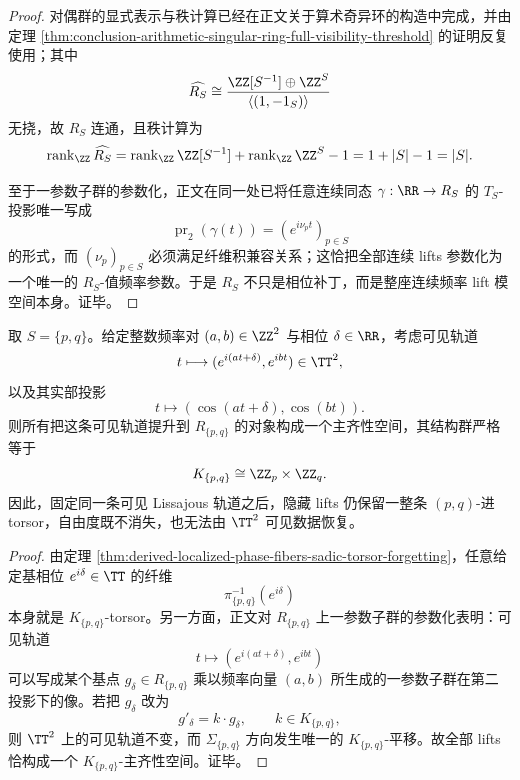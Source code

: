 \begin{proof}
对偶群的显式表示与秩计算已经在正文关于算术奇异环的构造中完成，并由定理 \ref{thm:conclusion-arithmetic-singular-ring-full-visibility-threshold} 的证明反复使用；其中
\[
\widehat{R_S}
\cong
\frac{\ZZ[S^{-1}]\oplus \ZZ^S}{\langle(1,-1_S)\rangle}
\]
无挠，故 \(R_S\) 连通，且秩计算为
\[
\operatorname{rank}_{\ZZ}\widehat{R_S}
=
\operatorname{rank}_{\ZZ}\ZZ[S^{-1}]
+
\operatorname{rank}_{\ZZ}\ZZ^S
-1
=
1+|S|-1
=
|S|.
\]

至于一参数子群的参数化，正文在同一处已将任意连续同态 \(\gamma:\RR\to R_S\) 的 \(T_S\)-投影唯一写成
\[
\operatorname{pr}_2(\gamma(t))=(e^{i\nu_p t})_{p\in S}
\]
的形式，而 \((\nu_p)_{p\in S}\) 必须满足纤维积兼容关系；这恰把全部连续 lifts 参数化为一个唯一的 \(R_S\)-值频率参数。于是 \(R_S\) 不只是相位补丁，而是整座连续频率 lift 模空间本身。证毕。
\end{proof}

\begin{corollary}\label{cor:derived-visible-lissajous-hidden-sadic-torsor-splitting}
取 \(S=\{p,q\}\)。给定整数频率对 \((a,b)\in\ZZ^2\) 与相位 \(\delta\in\RR\)，考虑可见轨道
\[
t\longmapsto (e^{i(at+\delta)},e^{ibt})\in \TT^2,
\]
以及其实部投影
\[
t\longmapsto (\cos(at+\delta),\cos(bt)).
\]
则所有把这条可见轨道提升到 \(R_{\{p,q\}}\) 的对象构成一个主齐性空间，其结构群严格等于
\[
K_{\{p,q\}}\cong \ZZ_p\times \ZZ_q.
\]
因此，固定同一条可见 Lissajous 轨道之后，隐藏 lifts 仍保留一整条 \((p,q)\)-进 torsor，自由度既不消失，也无法由 \(\TT^2\) 可见数据恢复。
\end{corollary}

\begin{proof}
由定理 \ref{thm:derived-localized-phase-fibers-sadic-torsor-forgetting}，任意给定基相位 \(e^{i\delta}\in\TT\) 的纤维
\[
\pi_{\{p,q\}}^{-1}(e^{i\delta})
\]
本身就是 \(K_{\{p,q\}}\)-torsor。另一方面，正文对 \(R_{\{p,q\}}\) 上一参数子群的参数化表明：可见轨道
\[
t\longmapsto (e^{i(at+\delta)},e^{ibt})
\]
可以写成某个基点 \(g_\delta\in R_{\{p,q\}}\) 乘以频率向量 \((a,b)\) 所生成的一参数子群在第二投影下的像。若把 \(g_\delta\) 改为
\[
g'_\delta=k\cdot g_\delta,
\qquad
k\in K_{\{p,q\}},
\]
则 \(\TT^2\) 上的可见轨道不变，而 \(\Sigma_{\{p,q\}}\) 方向发生唯一的 \(K_{\{p,q\}}\)-平移。故全部 lifts 恰构成一个 \(K_{\{p,q\}}\)-主齐性空间。证毕。
\end{proof}

